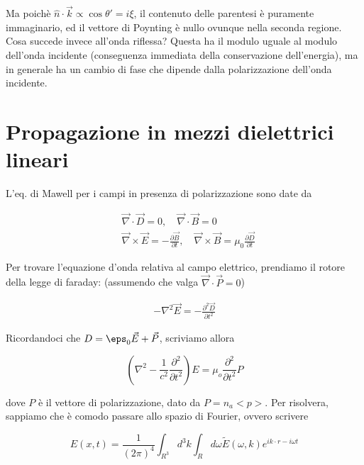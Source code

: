 \documentclass{report}
\begin{document}
Ma poichè \(\hat{n}\cdot \vec{k}\propto \cos\theta' = i\xi\), il contenuto delle parentesi è puramente immaginario, ed il vettore di Poynting è nullo ovunque nella seconda regione. \\

Cosa succede invece all'onda riflessa? Questa ha il modulo uguale al modulo dell'onda incidente (conseguenza immediata della conservazione dell'energia), ma in generale ha un cambio di fase che dipende dalla polarizzazione dell'onda incidente. 







\section{Propagazione in mezzi dielettrici lineari}

L'eq. di Mawell per i campi in presenza di polarizzazione sono date da  

\begin{align}
    &\vec{\nabla}\cdot \vec{D} = 0, \quad \vec{\nabla}\cdot \vec{B} = 0 \\
    &\vec{\nabla}\times \vec{E} = -\frac{\partial \vec{B}}{\partial t}, \quad \vec{\nabla}\times \vec{B} = \mu_0 \frac{\partial \vec{D}}{\partial t}
\end{align}

Per trovare l'equazione d'onda relativa al campo elettrico, prendiamo il rotore della legge di faraday: (assumendo che valga \(\vec{\nabla}\cdot \vec{P}=0\))

\begin{align}
    -\nabla^2 \vec{E} = -\frac{\partial ^2 \vec{D}}{\partial t^2}
\end{align}

Ricordandoci che \(D = \eps_0 \vec{E} + \vec{P}\), scriviamo allora 

\begin{tcolorbox}[colback=doc!15, colframe=black, boxrule=1pt]
\begin{equation}
    \left(\nabla^2 - \frac{1}{c^2}\frac{\partial^2}{\partial t^2} \right)E = \mu_o \frac{\partial^2}{\partial t^2}P 
\end{equation}
\end{tcolorbox}

dove $P$ è il vettore di polarizzazione, dato da $P = n_a<p>$. Per risolvera, sappiamo che è comodo passare allo spazio di Fourier, ovvero scrivere 

\begin{equation}
    E(x, t) = \frac{1}{(2\pi)^4}\int_{R^3} d^3k \int_Rd\omega \tilde{E}(\omega, k)e^{ik\cdot r - i\omega t}
\end{equation}
\end{document}
